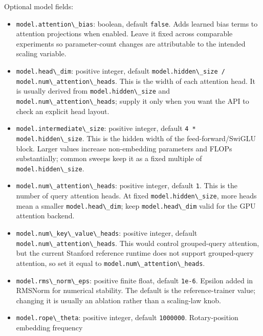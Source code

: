\documentclass[
]{article}
\newcommand{\passthrough}[1]{#1}
\providecommand{\tightlist}{%
  \setlength{\itemsep}{0pt}\setlength{\parskip}{0pt}}
\begin{document}
Optional model fields:

\begin{itemize}
\tightlist
\item
  \passthrough{\lstinline!model.attention\_bias!}: boolean, default
  \passthrough{\lstinline!false!}. Adds learned bias terms to attention
  projections when enabled. Leave it fixed across comparable experiments
  so parameter-count changes are attributable to the intended scaling
  variable.
\item
  \passthrough{\lstinline!model.head\_dim!}: positive integer, default
  \passthrough{\lstinline!model.hidden\_size / model.num\_attention\_heads!}.
  This is the width of each attention head. It is usually derived from
  \passthrough{\lstinline!model.hidden\_size!} and
  \passthrough{\lstinline!model.num\_attention\_heads!}; supply it only
  when you want the API to check an explicit head layout.
\item
  \passthrough{\lstinline!model.intermediate\_size!}: positive integer,
  default \passthrough{\lstinline!4 * model.hidden\_size!}. This is the
  hidden width of the feed-forward/SwiGLU block. Larger values increase
  non-embedding parameters and FLOPs substantially; common sweeps keep
  it as a fixed multiple of
  \passthrough{\lstinline!model.hidden\_size!}.
\item
  \passthrough{\lstinline!model.num\_attention\_heads!}: positive
  integer, default \passthrough{\lstinline!1!}. This is the number of
  query attention heads. At fixed
  \passthrough{\lstinline!model.hidden\_size!}, more heads mean a
  smaller \passthrough{\lstinline!model.head\_dim!}; keep
  \passthrough{\lstinline!model.head\_dim!} valid for the GPU attention
  backend.
\item
  \passthrough{\lstinline!model.num\_key\_value\_heads!}: positive
  integer, default
  \passthrough{\lstinline!model.num\_attention\_heads!}. This would
  control grouped-query attention, but the current Stanford reference
  runtime does not support grouped-query attention, so set it equal to
  \passthrough{\lstinline!model.num\_attention\_heads!}.
\item
  \passthrough{\lstinline!model.rms\_norm\_eps!}: positive finite float,
  default \passthrough{\lstinline!1e-6!}. Epsilon added in RMSNorm for
  numerical stability. The default is the reference-trainer value;
  changing it is usually an ablation rather than a scaling-law knob.
\item
  \passthrough{\lstinline!model.rope\_theta!}: positive integer, default
  \passthrough{\lstinline!1000000!}. Rotary-position embedding frequency

\end{itemize}
\end{document}
